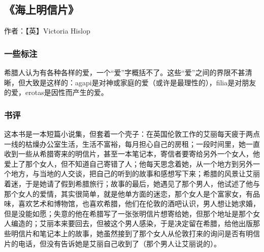 \subsection{《海上明信片》}

作者：【英】Victoria Hislop

\subsubsection{一些标注}

希腊人认为有各种各样的爱，一个“爱”字概括不了。这些“爱”之间的界限不甚清晰，但大致是这样的：agapi是对神或家庭的爱（或许是最理性的），filia是对朋友的爱，erotas是因性而产生的爱。

\subsubsection{书评}

这本书是一本短篇小说集，但套着一个壳子：在英国伦敦工作的艾丽每天疲于两点一线的枯燥办公室生活，生活不富裕，每月担心自己的房租；一段时间里，她一直收到一些从希腊寄来的明信片，甚至一本笔记本，寄信者要寄给另外一个女人，他爱上了那个女人，但不知道自己寄错了人；他每天思念着她，从一个地方到另外一个地方，与当地的人交谈，把自己的听到的故事和感想写下来；希腊的风景让艾丽着迷，于是她请了假到希腊旅行；故事的最后，她遇见了那个男人，他试述了他与那个女人的爱情，其实很简单，就是他单方面的迷恋，那个女人是个富家女，有品味，喜欢艺术和博物馆，也喜欢希腊，他们在伦敦的酒吧认识，男人想让她求婚，但是没能如愿；失意的他在希腊写了一张张明信片想寄给她，但那个地址是那个女人编造的；艾丽本来要回去，但被这个男人感染，于是决定留在希腊，给他出版那些明信片和笔记本上的故事，她虽然接到了那个女人从伦敦打来的询问是否有明信片的电话，但没有告诉她是艾丽自己收到了（那个男人让艾丽说的）。

